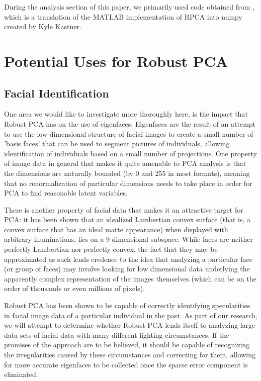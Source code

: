 \documentclass[11pt]{scrartcl} %
\theoremstyle{plain}
\begin{document}
During the analysis section of this paper, we primarily used code obtained from \cite{usedcode}, which is a translation of the MATLAB implementation of RPCA into numpy created by Kyle Kastner.

\section{Potential Uses for Robust PCA}

\subsection{Facial Identification}
One area we would like to investigate more thoroughly here, is the impact that Robust PCA has on the use of eigenfaces. Eigenfaces are the result of an attempt to use the low dimensional structure of facial images to create a small number of 'basis faces' that can be used to segment pictures of individuals, allowing identification of individuals based on a small number of projections. One property of image data in general that makes it quite amenable to PCA analysis is that the dimensions are naturally bounded (by 0 and 255 in most formats), meaning that no renormalization of particular dimensions needs to take place in order for PCA to find reasonable latent variables.

There is another property of facial data that makes it an attractive target for PCA: it has been shown that an idealized Lambertian convex surface (that is, a convex surface that has an ideal matte appearance) when displayed with arbitrary illuminations, lies on a 9 dimensional subspace\cite{lambertian}. While faces are neither perfectly Lambertian nor perfectly convex, the fact that they may be approximated as such lends credence to the idea that analyzing a particular face (or group of faces) may involve looking for low dimensional data underlying the apparently complex representation of the images themselves (which can be on the order of thousands or even millions of pixels).

Robust PCA has been shown to be capable of correctly identifying specularities in facial image data of a particular individual in the past\cite{rpca}. As part of our research, we will attempt to determine whether Robust PCA lends itself to analyzing large data sets of facial data with many different lighting circumstances. If the promises of the approach are to be believed, it should be capable of recognizing the irregularities caused by these circumstances and correcting for them, allowing for more accurate eigenfaces to be collected once the sparse error component is eliminated.
\end{document}
